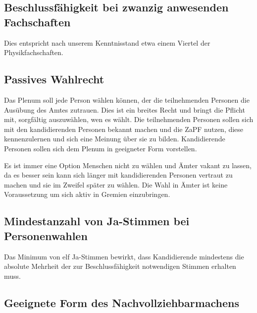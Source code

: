 \documentclass[
  a4paper,
  oneside]{scrartcl}
\begin{document}
\hypertarget{beschlussfuxe4higkeit-bei-zwanzig-anwesenden-fachschaften}{%
\subsection*{Beschlussfähigkeit bei zwanzig anwesenden
Fachschaften}\label{beschlussfuxe4higkeit-bei-zwanzig-anwesenden-fachschaften}}

Dies entspricht nach unserem Kenntnisstand etwa einem Viertel der
Physikfachschaften.

\hypertarget{passives-wahlrecht}{%
\subsection*{Passives Wahlrecht}\label{passives-wahlrecht}}

Das Plenum soll jede Person wählen können, der die teilnehmenden
Personen die Ausübung des Amtes zutrauen. Dies ist ein breites Recht und
bringt die Pflicht mit, sorgfältig auszuwählen, wen es wählt. Die
teilnehmenden Personen sollen sich mit den kandidierenden Personen
bekannt machen und die ZaPF nutzen, diese kennenzulernen und sich eine
Meinung über sie zu bilden. Kandidierende Personen sollen sich dem
Plenum in geeigneter Form vorstellen.

Es ist immer eine Option Menschen nicht zu wählen und Ämter vakant zu
lassen, da es besser sein kann sich länger mit kandidierenden Personen
vertraut zu machen und sie im Zweifel später zu wählen. Die Wahl in
Ämter ist keine Voraussetzung um sich aktiv in Gremien einzubringen.

\hypertarget{mindestanzahl-von-ja-stimmen-bei-personenwahlen}{%
\subsection*{Mindestanzahl von Ja-Stimmen bei
Personenwahlen}\label{mindestanzahl-von-ja-stimmen-bei-personenwahlen}}

Das Minimum von elf Ja-Stimmen bewirkt, dass Kandidierende mindestens
die absolute Mehrheit der zur Beschlussfähigkeit notwendigen Stimmen
erhalten muss.

\hypertarget{geeignete-form-des-nachvollziehbarmachens}{%
\subsection*{Geeignete Form des
Nachvollziehbarmachens}\label{geeignete-form-des-nachvollziehbarmachens}}
\end{document}
